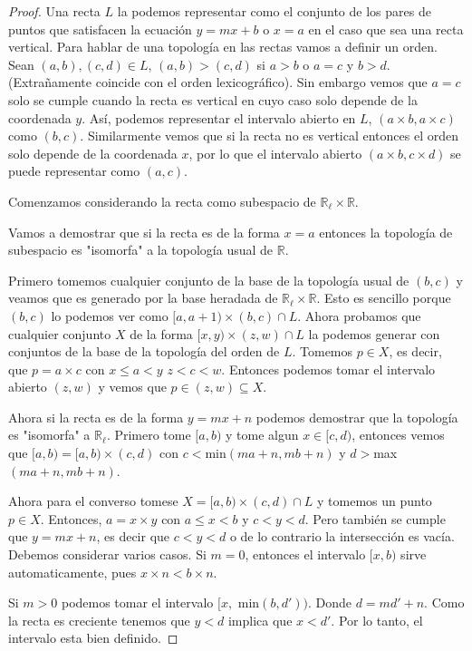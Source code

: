 \documentclass[letter,twoside,11pt]{article}
\begin{document}
\begin{enumerate}
\begin{proof}
Una recta $L$ la podemos representar como el conjunto de los pares de puntos que satisfacen la ecuaci\'on $y=mx+b$ o $x=a$ en el caso que sea una recta vertical. Para hablar de una topolog\'ia en las rectas vamos a definir un orden. Sean $(a,b), (c,d) \in L$, $(a,b)>(c,d)$ si $a>b$ o $a=c$ y $b>d$. (Extra\~namente coincide con el orden lexicogr\'afico). Sin embargo vemos que $a=c$ solo se cumple cuando la recta es vertical en cuyo caso solo depende de la coordenada $y$. As\'i, podemos representar el intervalo abierto en $L$, $(a \times b, a \times c)$ como $(b,c)$. Similarmente vemos que si la recta no es vertical entonces el orden solo depende de la coordenada $x$, por lo que el intervalo abierto $(a \times b, c \times d)$ se puede representar como $(a,c)$.

Comenzamos considerando la recta como subespacio de $\mathbb{R}_{\ell} \times \mathbb{R}$. 

Vamos a demostrar que si la recta es de la forma $x=a$ entonces la topolog\'ia de subespacio es "isomorfa" a la topolog\'ia usual de $\mathbb{R}$.

Primero tomemos cualquier conjunto de la base de la topolog\'ia usual de $(b,c)$ y veamos que es generado por la base heradada de $\mathbb{R}_{\ell} \times \mathbb{R}$. Esto es sencillo porque $(b,c)$ lo podemos ver como $[a,a+1)\times(b,c) \cap L$. Ahora probamos que cualquier conjunto $X$ de la forma $[x,y) \times (z,w) \cap L$ la podemos generar con conjuntos de la base de la topolog\'ia del orden de $L$. Tomemos $p \in X$, es decir, que $p = a \times c$ con $x\leq a<y$ $z<c<w$. Entonces podemos tomar el intervalo abierto $(z,w)$ y vemos que $p \in (z,w)\subseteq X$.

Ahora si la recta es de la forma $y=mx+n$ podemos demostrar que la topolog\'ia es "isomorfa" a $\mathbb{R}_{\ell}$. Primero tome $[a,b)$ y tome algun $x \in [c,d)$, entonces vemos que $[a,b)=[a,b) \times (c,d)$ con $c<$min$(ma+n,mb+n)$ y $d>$max$(ma+n,mb+n)$. 

Ahora para el converso tomese $X=[a,b) \times (c,d) \cap L$ y tomemos un punto $p \in X$. Entonces, $a = x \times y$ con $a\leq x<b$ y $c<y<d$. Pero tambi\'en se cumple que $y=mx+n$, es decir que $c<y<d$ o de lo contrario la intersecci\'on es vac\'ia. Debemos considerar varios casos. Si $m=0$, entonces el intervalo $[x,b)$ sirve automaticamente, pues $x \times n < b \times n$.

Si $m>0$ podemos tomar el intervalo $[x,$ min$(b,d'))$. Donde $d=md'+n$. Como la recta es creciente tenemos que $y<d$ implica que $x<d'$. Por lo tanto, el intervalo esta bien definido.


\end{proof}
\end{enumerate}
\end{document}
